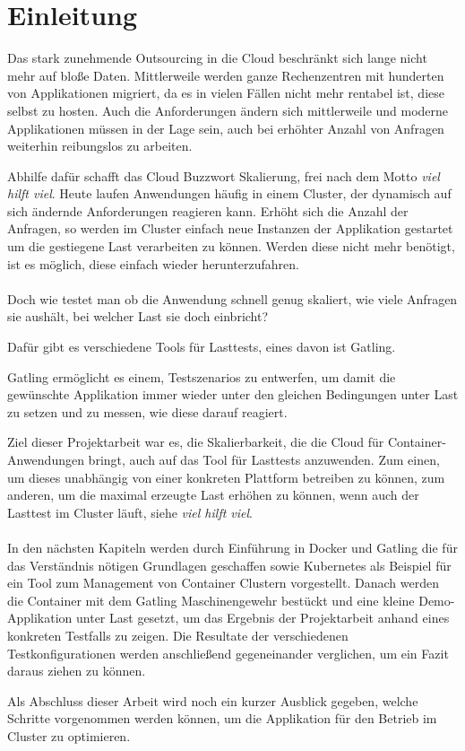 \chapter{Einleitung}
Das stark zunehmende Outsourcing in die Cloud beschränkt sich lange nicht mehr auf bloße Daten.
Mittlerweile werden ganze Rechenzentren mit hunderten von Applikationen migriert, da es in vielen Fällen nicht mehr rentabel ist, diese selbst zu hosten.
Auch die Anforderungen ändern sich mittlerweile und moderne Applikationen müssen in der Lage sein, auch bei erhöhter Anzahl von Anfragen weiterhin reibungslos zu arbeiten.

Abhilfe dafür schafft das Cloud Buzzwort Skalierung, frei nach dem Motto \textit{viel hilft viel}.
Heute laufen Anwendungen häufig in einem Cluster, der dynamisch auf sich ändernde Anforderungen reagieren kann. 
Erhöht sich die Anzahl der Anfragen, so werden im Cluster einfach neue Instanzen der Applikation gestartet um die gestiegene Last verarbeiten zu können. 
Werden diese nicht mehr benötigt, ist es möglich, diese einfach wieder herunterzufahren.
\\\\
Doch wie testet man ob die Anwendung schnell genug skaliert, wie viele Anfragen sie aushält, bei welcher Last sie doch einbricht?

Dafür gibt es verschiedene Tools für Lasttests, eines davon ist Gatling.

Gatling ermöglicht es einem, Testszenarios zu entwerfen, um damit die gewünschte Applikation immer wieder unter den gleichen Bedingungen unter Last zu setzen und zu messen, wie diese darauf reagiert.

Ziel dieser Projektarbeit war es, die Skalierbarkeit, die die Cloud für Container-Anwendungen bringt, auch auf das Tool für Lasttests anzuwenden. 
Zum einen, um dieses unabhängig von einer konkreten Plattform betreiben zu können, zum anderen, um die maximal erzeugte Last erhöhen zu können, wenn auch der Lasttest im Cluster läuft, siehe \textit{viel hilft viel}.\\\\
In den nächsten Kapiteln werden durch Einführung in Docker und Gatling die für das Verständnis nötigen Grundlagen geschaffen sowie Kubernetes als Beispiel für ein Tool zum Management von Container Clustern vorgestellt.
Danach werden die Container mit dem Gatling Maschinengewehr bestückt und eine kleine Demo-Applikation unter Last gesetzt, um das Ergebnis der Projektarbeit anhand eines konkreten Testfalls zu zeigen. Die Resultate der verschiedenen Testkonfigurationen werden anschließend gegeneinander verglichen, um ein Fazit daraus ziehen zu können.

Als Abschluss dieser Arbeit wird noch ein kurzer Ausblick gegeben, welche Schritte vorgenommen werden können, um die Applikation für den Betrieb im Cluster zu optimieren.